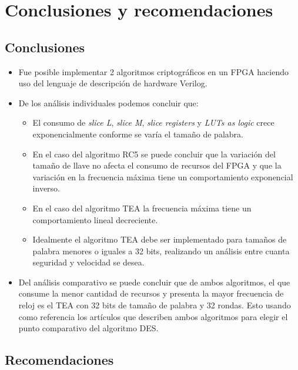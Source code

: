 \chapter{Conclusiones y recomendaciones}
\section*{Conclusiones}

\begin{itemize}
\item Fue posible implementar 2 algoritmos criptográficos en un FPGA haciendo uso del lenguaje de descripción de hardware Verilog.

\item De los análisis individuales podemos concluir que:
\begin{itemize}
\item El consumo de \textit{slice L}, \textit{slice M}, \textit{slice registers} y \textit{LUTs as logic} crece exponencialmente conforme se varía el tamaño de palabra.
\item En el caso del algoritmo RC5 se puede concluir que la variación del tamaño de llave no afecta el consumo de recursos del FPGA y que la variación en la frecuencia máxima tiene un comportamiento exponencial inverso.
\item En el caso del algoritmo TEA la frecuencia máxima tiene un comportamiento lineal decreciente.
\item Idealmente el algoritmo TEA debe ser implementado para tamaños de palabra menores o iguales a 32 bits, realizando un análisis entre cuanta seguridad y velocidad se desea.
\end{itemize}


\item Del análisis comparativo se puede concluir que de ambos algoritmos, el que consume la menor cantidad de recursos y presenta la mayor frecuencia de reloj es el TEA con 32 bits de tamaño de palabra y 32 rondas. Esto usando como referencia los artículos que describen ambos algoritmos para elegir el punto comparativo del algoritmo DES.
\end{itemize}

\section*{Recomendaciones}

